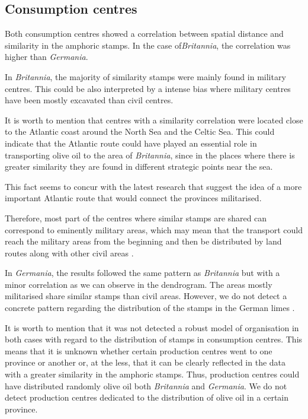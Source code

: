 \documentclass[review]{elsarticle}
\begin{document}
\subsection{Consumption centres}

Both consumption centres showed a correlation between spatial distance and similarity in the amphoric stamps. In the case of\textit{Britannia}, the correlation was higher than \textit{Germania}.

In \textit{Britannia}, the majority of similarity stamps were mainly found in military centres. This could be also interpreted by a intense bias where military centres have been mostly excavated than civil centres. 

It is worth to mention that centres with a similarity correlation were located close to the Atlantic coast around the North Sea and the Celtic Sea. This could indicate that the Atlantic route could have played an essential role in transporting olive oil to the area of \textit{Britannia}, since in the places where there is greater similarity they are found in different strategic points near the sea.

This fact seems to concur with the latest research that suggest the idea of a more important Atlantic route that would connect the provinces militarised\citep{remesal_annona_1986,
remesal_provincial_2008,
carreras_atlantic_2012,
morillo_hispania_2016,rubio-campillo_provincias_2018}.

Therefore, most part of the centres where similar stamps are shared can correspond to eminently military areas, which may mean that the transport could reach the military areas from the beginning and then be distributed by land routes along with other civil areas \citep{carreras_britannia_1998,
ayllon_olive_2018}.

In \textit{Germania}, the results followed the same pattern as \textit{Britannia} but with a minor correlation as we can observe in the dendrogram. The areas mostly militarised share similar stamps than civil areas. However, we do not detect a concrete pattern regarding the distribution of the stamps in the German limes \citep{xanten2018}. 

It is worth to mention that it was not detected a robust model of organisation in both cases with regard to the distribution of stamps in consumption centres. This means
that it is unknown whether certain production centres went to one province or another or, at the
less, that it can be clearly reflected in the data with a greater similarity in the amphoric stamps. Thus, production centres could have distributed randomly olive oil both \textit{Britannia} and \textit{Germania}. We do not detect production centres dedicated to the distribution of olive oil in a certain province. 
\end{document}
